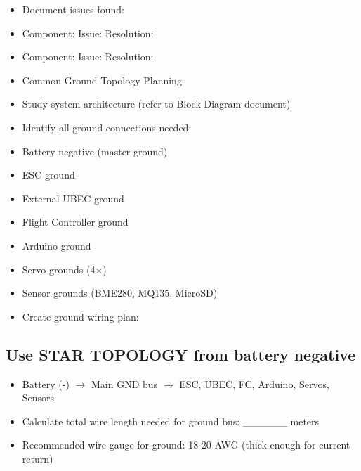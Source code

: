 \documentclass[11pt,letterpaper]{article}
\begin{document}
\begin{itemize}
  \item Document issues found:
  \item Component: \underline{\hspace{2.4cm}}  Issue: \underline{\hspace{2.4cm}}  Resolution: \underline{\hspace{2.4cm}}
  \item Component: \underline{\hspace{2.4cm}}  Issue: \underline{\hspace{2.4cm}}  Resolution: \underline{\hspace{2.4cm}}
\end{itemize}

\begin{itemize}
  \item Common Ground Topology Planning
  \item Study system architecture (refer to Block Diagram document)
  \item Identify all ground connections needed:
  \item Battery negative (master ground)
  \item ESC ground
  \item External UBEC ground
  \item Flight Controller ground
  \item Arduino ground
  \item Servo grounds (4$\times$)
  \item Sensor grounds (BME280, MQ135, MicroSD)
\end{itemize}

\begin{itemize}
  \item Create ground wiring plan:
\end{itemize}

\subsection{Use STAR TOPOLOGY from battery negative}

\begin{itemize}
  \item Battery (-) $\rightarrow$ Main GND bus $\rightarrow$ ESC, UBEC, FC, Arduino, Servos, Sensors
\end{itemize}

\begin{itemize}
  \item Calculate total wire length needed for ground bus: \_\_\_\_\_\_ meters
  \item Recommended wire gauge for ground: 18-20 AWG (thick enough for current return)
\end{itemize}
\end{document}
